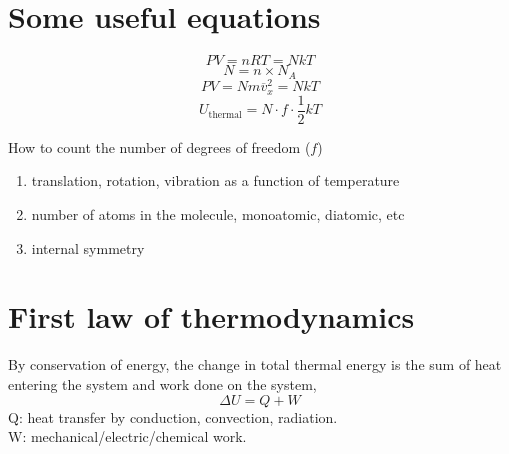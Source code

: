 

\section{Some useful equations} %
\begin{equation} \label{idealgas} PV = nRT = NkT \end{equation}
\begin{equation} \label{Avogadro} N = n \times N_A \end{equation}
\begin{equation} \label{PV-micro} PV = Nm{\overline v_x^2} = NkT \end{equation}
\begin{equation} \label{eqpartition} U_\text{thermal} = N \cdot f \cdot \frac{1}{2}kT \end{equation}

How to count the number of degrees of freedom ($f$)
\begin{enumerate}
\item{translation, rotation, vibration as a function of temperature}
\item{number of atoms in the molecule, monoatomic, diatomic, etc}
\item{internal symmetry}
\end{enumerate}

\section{First law of thermodynamics}
By conservation of energy, the change in total thermal energy is the sum of heat entering the system and work done on the system,
\begin{equation} \label{1st} \Delta{U} = Q + W \end{equation}
Q: heat transfer by conduction, convection, radiation.\\
W: mechanical/electric/chemical work. \\

